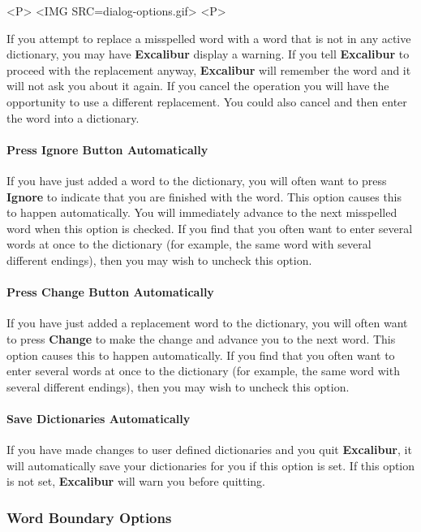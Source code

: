 \documentclass[11pt,titlepage]{article}
\newcommand{\ex}{\textbf{Excalibur}}
\begin{document}
\begin{rawhtml}
<P>
<IMG SRC=dialog-options.gif>
<P>
\end{rawhtml}

If you attempt to replace a misspelled word with a word that is not in
any active dictionary, you may have \ex{} display a warning.  If you
tell \ex{} to proceed with the replacement anyway, \ex{} will remember
the word and it will not ask you about it again.  If you cancel the
operation you will have the opportunity to use a different
replacement.  You could also cancel and then enter the word into a
dictionary.

\paragraph{Press Ignore Button Automatically}

If you have just added a word to the dictionary, you will often want
to press \textbf{Ignore} to indicate that you are finished with the
word.  This option causes this to happen automatically. You will
immediately advance to the next misspelled word when this option is
checked. If you find that you often want to enter several words at
once to the dictionary (for example, the same word with several
different endings), then you may wish to uncheck this option.

\paragraph{Press Change Button Automatically}

If you have just added a replacement word to the dictionary, you will
often want to press \textbf{Change} to make the change and advance you
to the next word. This option causes this to happen automatically. If
you find that you often want to enter several words at once to the
dictionary (for example, the same word with several different
endings), then you may wish to uncheck this option.

\paragraph{Save Dictionaries Automatically}

If you have made changes to user defined dictionaries and you quit
\ex, it will automatically save your dictionaries for you if this
option is set. If this option is not set, \ex{} will warn you before
quitting.

\subsubsection{Word Boundary Options}
\end{document}
